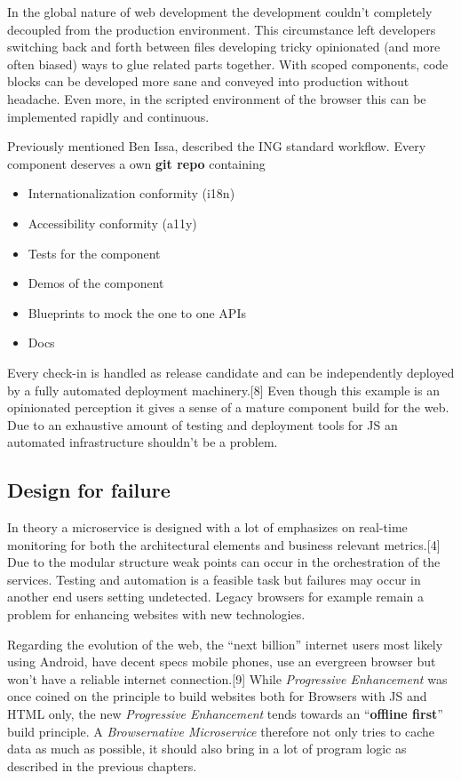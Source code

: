 \documentclass[]{article}
\providecommand{\tightlist}{%
  \setlength{\itemsep}{0pt}\setlength{\parskip}{0pt}}
\begin{document}
In the global nature of web development the development couldn't
completely decoupled from the production environment. This circumstance
left developers switching back and forth between files developing tricky
opinionated (and more often biased) ways to glue related parts together.
With scoped components, code blocks can be developed more sane and
conveyed into production without headache. Even more, in the scripted
environment of the browser this can be implemented rapidly and
continuous.

Previously mentioned Ben Issa, described the ING standard workflow.
Every component deserves a own \textbf{git repo} containing

\begin{itemize}
\tightlist
\item
  Internationalization conformity (i18n)
\item
  Accessibility conformity (a11y)
\item
  Tests for the component
\item
  Demos of the component
\item
  Blueprints to mock the one to one APIs
\item
  Docs
\end{itemize}

Every check-in is handled as release candidate and can be independently
deployed by a fully automated deployment machinery.{[}8{]} Even though
this example is an opinionated perception it gives a sense of a mature
component build for the web. Due to an exhaustive amount of testing and
deployment tools for JS an automated infrastructure shouldn't be a
problem.

\subsection{Design for failure}\label{design-for-failure}

In theory a microservice is designed with a lot of emphasizes on
real-time monitoring for both the architectural elements and business
relevant metrics.{[}4{]} Due to the modular structure weak points can
occur in the orchestration of the services. Testing and automation is a
feasible task but failures may occur in another end users setting
undetected. Legacy browsers for example remain a problem for enhancing
websites with new technologies.

Regarding the evolution of the web, the ``next billion'' internet users
most likely using Android, have decent specs mobile phones, use an
evergreen browser but won't have a reliable internet connection.{[}9{]}
While \emph{Progressive Enhancement} was once coined on the principle to
build websites both for Browsers with JS and HTML only, the new
\emph{Progressive Enhancement} tends towards an ``\textbf{offline
first}'' build principle. A \emph{Browsernative Microservice} therefore
not only tries to cache data as much as possible, it should also bring
in a lot of program logic as described in the previous chapters.
\end{document}
